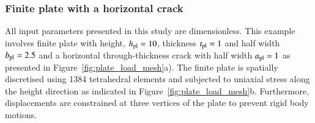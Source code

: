 \documentclass[11pt]{acmeArticle}
\numberwithin{equation}{section}
\begin{document}
\subsubsection{Finite plate with a horizontal crack}\label{sec:plate_section}
All input parameters presented in this study are dimensionless. 
This example involves finite plate with height, $h_{\rm {pl}} = 10$, thickness $t_{\rm {pl}}=1$ and half width $b_{\rm{pl}} = 2.5$ and a horizontal through-thickness crack with half width $a_{\rm {pl}} = 1$ as presented in Figure~\ref{fig:plate_load_mesh}a).
The finite plate is spatially discretised using 1384 tetrahedral elements and subjected to uniaxial stress along the height direction as indicated in Figure~\ref{fig:plate_load_mesh}b. 
Furthermore, displacements are constrained at three vertices of the plate to prevent rigid body motions. 
\end{document}
